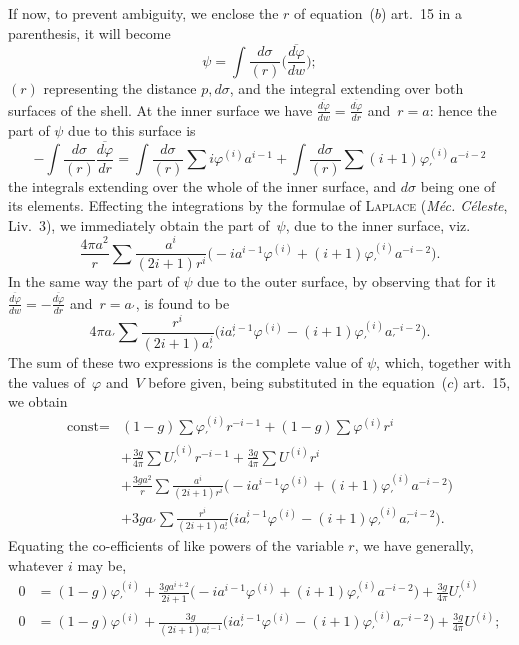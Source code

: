 \documentclass[12pt,notitlepage]{amsart}
\let\Person\textsc
\let\Title\textit
\renewcommand{\phi}{\varphi}
\begin{document}
If now, to prevent ambiguity, we enclose the $r$ of equation~($b$) art.~15
in a parenthesis, it will become
\[
\psi=\int\frac{d\sigma}{(r)}\biggl(\frac{\overline{d\phi}}{dw}\biggr);
\]
$(r)$ representing the distance $p,d\sigma$,
and the integral extending over both
surfaces of the shell. At the inner surface we have
$\frac{\overline{d\phi}}{dw}=\frac{\overline{d\phi}}{dr}$
and~$r=a$:
hence the part of $\psi$ due to this surface is
\[
-\int\frac{d\sigma}{(r)}\frac{\overline{d\phi}}{dr}
=\int\frac{d\sigma}{(r)}\sum i\phi^{(i)}a^{i-1}
+\int\frac{d\sigma}{(r)}\sum (i+1)\phi_\prime^{(i)}a^{-i-2}
\]
the integrals extending over the whole of the inner surface, and $d\sigma$ being
one of its elements. Effecting the integrations
by the formulae of \Person{Laplace}
(\Title{M\'ec. C\'eleste}, Liv.~3),
we immediately obtain the part of~$\psi$, due to the inner
surface, viz.
\[
\frac{4\pi a^2}{r}\sum\frac{a^i}{(2i+1)r^i}
\bigl(-ia^{i-1}\phi^{(i)}+(i+1)\phi_\prime^{(i)}a^{-i-2}\bigr).
\]
In the same way the part of $\psi$ due to the outer surface, by observing that
for it $\frac{\overline{d\phi}}{dw}=-\frac{\overline{d\phi}}{dr}$
and~$r=a_\prime$, is found to be
\[
4\pi a_\prime \sum\frac{r^i}{(2i+1)a_\prime^i}
\bigl(ia_\prime^{i-1}\phi^{(i)}-(i+1)\phi_\prime^{(i)}a_\prime^{-i-2}\bigr).
\]
The sum of these two expressions is the complete value of $\psi$,
which, together
with the values of~$\phi$ and~$V$ before given,
being substituted in the equation~($c$)
art.~15, we obtain
\[
\begin{aligned}
\text{const}=
&(1-g)\sum\phi_\prime^{(i)}r^{-i-1}
+(1-g)\sum\phi^{(i)}r^{i}\\
&+\frac{3g}{4\pi}\sum U_\prime^{(i)}r^{-i-1}
+\frac{3g}{4\pi}\sum U^{(i)}r^{i}\\
&+\frac{3ga^2}{r}\sum\frac{a^i}{(2i+1)r^i}
\bigl(-ia^{i-1}\phi^{(i)}+(i+1)\phi_\prime^{(i)}a^{-i-2}\bigr)\\
&+3ga_\prime \sum\frac{r^i}{(2i+1)a_\prime^i}
\bigl(ia_\prime^{i-1}\phi^{(i)}-(i+1)\phi_\prime^{(i)}a_\prime^{-i-2}\bigr).
\end{aligned}
\]
Equating the co-efficients of like powers of the variable $r$,
we have generally,
whatever $i$ may be,
\[
\begin{aligned}
0 &= (1-g)\phi_\prime^{(i)}+\frac{3ga^{i+2}}{2i+1}
\bigl(-ia^{i-1}\phi^{(i)}+(i+1)\phi_\prime^{(i)}a^{-i-2}\bigr)
+\frac{3g}{4\pi}U_\prime^{(i)}\\
0 &= (1-g)\phi^{(i)}+\frac{3g}{(2i+1)a_\prime^{i-1}}
\bigl(ia_\prime^{i-1}\phi^{(i)}-(i+1)\phi_\prime^{(i)}a_\prime^{-i-2}\bigr)
+\frac{3g}{4\pi}U^{(i)};
\end{aligned}
\]
\end{document}
